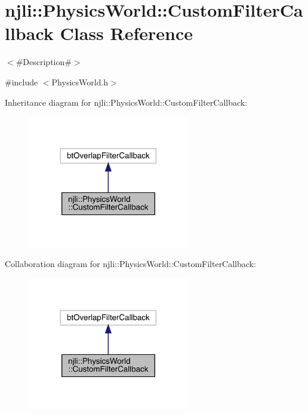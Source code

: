 \hypertarget{classnjli_1_1_physics_world_1_1_custom_filter_callback}{}\section{njli\+:\+:Physics\+World\+:\+:Custom\+Filter\+Callback Class Reference}
\label{classnjli_1_1_physics_world_1_1_custom_filter_callback}


$<$\#\+Description\#$>$  




{\ttfamily \#include $<$Physics\+World.\+h$>$}



Inheritance diagram for njli\+:\+:Physics\+World\+:\+:Custom\+Filter\+Callback\+:\nopagebreak
\begin{figure}[H]
\begin{center}
\leavevmode
\includegraphics[width=200pt]{classnjli_1_1_physics_world_1_1_custom_filter_callback__inherit__graph}
\end{center}
\end{figure}


Collaboration diagram for njli\+:\+:Physics\+World\+:\+:Custom\+Filter\+Callback\+:\nopagebreak
\begin{figure}[H]
\begin{center}
\leavevmode
\includegraphics[width=200pt]{classnjli_1_1_physics_world_1_1_custom_filter_callback__coll__graph}
\end{center}
\end{figure}
